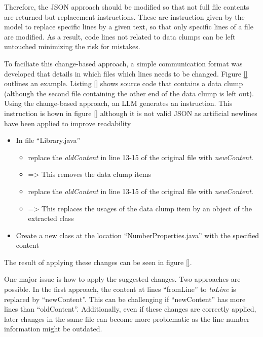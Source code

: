 Therefore, the \ac{JSON} approach should be modified so that not full file contents are returned but replacement instructions. These are instruction given by the model to replace specific lines by a given text, so that only specific lines of a file are modified.  As a result, code lines not related to data clumps can be left untouched minimizing the risk for mistakes. 


 
To faciliate this change-based approach, a simple communication format was developed that details in which files which lines needs to be changed. Figure \ref{} outlines an example. Listing \ref{} shows source code that contains a data clump (although the second file containing the other end of the data clump is left out). Using the change-based approach, an \ac{LLM} generates an instruction. This instruction is hown in figure \ref{} although it is not valid \ac{JSON} as artificial newlines have been applied to improve readability
\begin{itemize}
    \item In file \enquote{Library.java}
    \begin{itemize}
        \item replace the \textit{oldContent} in line 13-15 of the original file with \textit{newContent}.
        \item => This removes the data clump items
       \item replace the \textit{oldContent} in line 13-15 of the original file with \textit{newContent}.
        \item => This replaces the usages of the data clump item by an object of the extracted class 
    \end{itemize}
    \item Create a new class at the location \enquote{NumberProperties.java} with the specified content
\end{itemize}

The result of applying these changes can be seen in figure \ref{}.

One major issue is how to apply the suggested changes. Two approaches are possible.
In the first approach, the content at lines \enquote{fromLine} to \textit{toLine} is replaced by \enquote{newContent}. This can be challenging if \enquote{newContent} has more lines than \enquote{oldContent}. Additionally, even if these  changes are correctly applied, later changes in the same file can become more problematic as the line number information might be outdated. 

